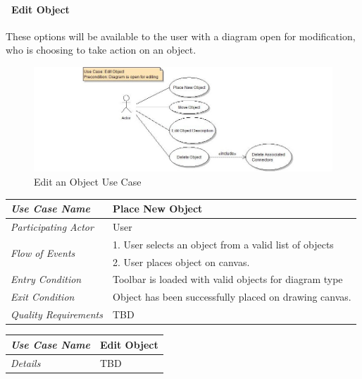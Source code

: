 \documentclass[twoside,letterpaper]{article}
\begin{document}
\paragraph[\ Use Category]
{\ Edit Object} {These options will be available to the user with a diagram open for modification, who is choosing to take action on an object.}

\begin{figure}[h]
\centering
\includegraphics[width=6.0in]{ucaseEditObj.jpg}
\caption{Edit an Object Use Case}
\end{figure}

\begin{flushleft}
\tablehead{}
\begin{tabular}{|m{2.0in} m{5.0in}|}
\hline
{\bfseries\emph{Use Case Name}}
& {\bfseries Place New Object}
\\\hline
\emph{Participating Actor}
& User
\\\hline
\multirow{2}{*}{\emph{Flow of Events}}
& 1.  User selects an object from a valid list of objects \\
& 2.  User places object on canvas.
\\\hline
\emph{Entry Condition}
& Toolbar is loaded with valid objects for diagram type
\\\hline
\emph{Exit Condition}
& Object has been successfully placed on drawing canvas.
\\\hline
\emph{Quality Requirements}
& TBD
\\\hline
\end{tabular}
\end{flushleft}
\bigskip

\begin{flushleft}
\tablehead{}
\begin{tabular}{|m{2.0in} m{5.0in}|}
\hline
{\bfseries\emph{Use Case Name}}
& {\bfseries Edit Object}
\\\hline
\emph{Details}
& TBD
\\\hline
\end{tabular}
\end{flushleft}
\bigskip
\end{document}
